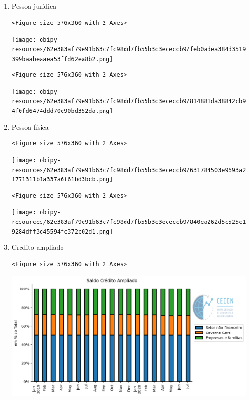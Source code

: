 \documentclass[11pt]{article}
\begin{document}
\begin{enumerate}
\item Pessoa jurídica
\label{sec:orga7d6329}

\begin{verbatim}
<Figure size 576x360 with 2 Axes>
\end{verbatim}


\begin{center}
\texttt{[image: obipy-resources/62e383af79e91b63c7fc98dd7fb55b3c3ececcb9/feb0adea384d3519399baabeaaea53ffd62ea8b2.png]}
\end{center}


\begin{verbatim}
<Figure size 576x360 with 2 Axes>
\end{verbatim}


\begin{center}
\texttt{[image: obipy-resources/62e383af79e91b63c7fc98dd7fb55b3c3ececcb9/814881da38842cb94f0fd6474ddd70e90bd352da.png]}
\end{center}

\item Pessoa física
\label{sec:orgacb10d0}

\begin{verbatim}
<Figure size 576x360 with 2 Axes>
\end{verbatim}


\begin{center}
\texttt{[image: obipy-resources/62e383af79e91b63c7fc98dd7fb55b3c3ececcb9/631784503e9693a2f771311b1a337a6f61bd3bcb.png]}
\end{center}

\begin{verbatim}
<Figure size 576x360 with 2 Axes>
\end{verbatim}


\begin{center}
\texttt{[image: obipy-resources/62e383af79e91b63c7fc98dd7fb55b3c3ececcb9/840ea262d5c525c19284dff3d45594fc372c02d1.png]}
\end{center}

\item Crédito ampliado
\label{sec:orgc04387f}

\begin{verbatim}
<Figure size 576x360 with 2 Axes>
\end{verbatim}


\begin{center}
\includegraphics[width=.9\linewidth]{obipy-resources/62e383af79e91b63c7fc98dd7fb55b3c3ececcb9/fc25f4901d8007b52b37c8cc10e4620bc37873f2.png}
\end{center}


\end{enumerate}
\end{document}
